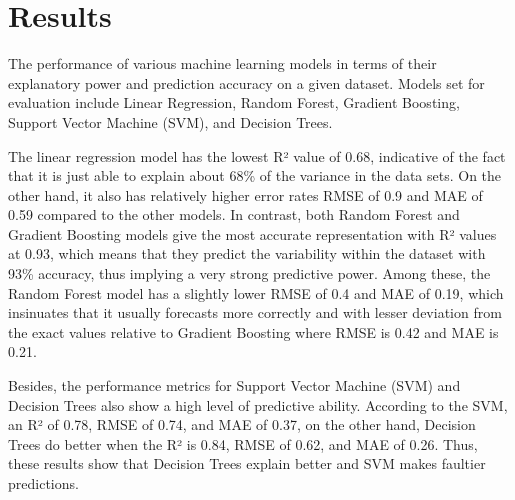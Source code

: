 \documentclass[conference]{IEEEtran}
\begin{document}
\section{Results}
The performance of various machine learning models in terms of their explanatory power and prediction accuracy on a given dataset. Models set for evaluation include Linear Regression, Random Forest, Gradient Boosting, Support Vector Machine (SVM), and Decision Trees. 

The linear regression model has the lowest R² value of 0.68,  indicative of the fact that it is just able to explain about 68\% of the variance in the data sets. On the other hand, it also has relatively higher error rates RMSE of 0.9 and MAE of 0.59 compared to the other models. In contrast, both Random Forest and Gradient Boosting models give the most accurate representation with R² values at 0.93, which means that they predict the variability within the dataset with 93\% accuracy, thus implying a very strong predictive power. Among these, the Random Forest model has a slightly lower RMSE of 0.4 and MAE of 0.19, which insinuates that it usually forecasts more correctly and with lesser deviation from the exact values relative to Gradient Boosting where RMSE is 0.42 and MAE is 0.21.

Besides, the performance metrics for Support Vector Machine (SVM) and Decision Trees also show a high level of predictive ability. According to the SVM, an R² of 0.78, RMSE of 0.74, and MAE of 0.37, on the other hand, Decision Trees do better when the R² is 0.84, RMSE of 0.62, and MAE of 0.26. Thus, these results show that Decision Trees explain better and SVM makes faultier predictions.
\end{document}
